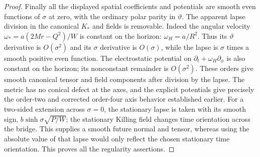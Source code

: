 \begin{proof}
Finally all the displayed spatial coefficients and potentials
are smooth even functions of $\sigma$ at zero, with the
ordinary polar parity in $\vartheta$.  The apparent lapse
division in the canonical $K_*$ and fields is removable.
Indeed the angular velocity
$\omega_*=a(2Mr-Q^2)/W$ is constant on the horizon:
$\omega_H=a/R^2$.  Thus its $\vartheta$ derivative is
$O(\sigma^2)$ and its $\sigma$ derivative is $O(\sigma)$,
while the lapse is $\sigma$ times a smooth positive even
function.  The electrostatic potential on
$\partial_t+\omega_H\partial_\phi$ is also constant on the
horizon; its nonconstant remainder is $O(\sigma^2)$.
These orders give smooth canonical tensor and field components
after division by the lapse.  The metric has no conical defect
at the axes, and the explicit potentials give precisely the
order-two and corrected order-four axis behavior established
earlier.  For a two-sided extension across $\sigma=0$, the
stationary lapse is taken with its smooth sign,
$b\sinh\sigma\sqrt{P/W}$; the stationary Killing field changes
time orientation across the bridge.  This supplies a smooth
future normal and tensor, whereas using the absolute value of
that lapse would only reflect the chosen stationary time
orientation.  This proves all the regularity assertions.
\end{proof}
